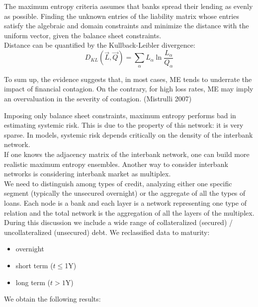 The maximum entropy criteria assumes that banks spread their lending as evenly as possible. Finding the unknown entries of the liability matrix whose entries satisfy the algebraic and domain constraints and minimize the distance with the uniform vector, given the balance sheet constraints.\\
Distance can be quantified by the Kullback-Leibler divergence:
\[
D_{KL} (\vec{L}, \vec{Q}) = \sum_\alpha L_\alpha \ln \frac{L_\alpha}{Q_\alpha}
\]
\begin{myquote}
	To sum up, the evidence suggests that, in most cases, ME tends to underrate the impact of financial contagion. On the contrary, for high loss rates, ME may imply an overvaluation in the severity of
	contagion. (Mistrulli 2007)
\end{myquote}
Imposing only balance sheet constraints, maximum entropy performs bad in estimating systemic risk. This is due to the property of this network: it is very sparse. In models, systemic risk depends critically on the density of the interbank network.\\
If one knows the adjacency matrix of the interbank network, one can build more realistic maximum entropy ensembles.
Another way to consider interbank networks is considering interbank market as multiplex.\\
We need to distinguish among types of credit, analyzing either one specific segment (typically the unsecured overnight) or the aggregate of all the types of loans. Each node is a bank and each layer is a network representing one type of relation and the total network is the aggregation of all the layers of the multiplex.\\
During this discussion we include a wide range of collateralized (secured) / uncollateralized (unsecured) debt. We reclassified data to maturity:
\begin{itemize}
	\item overnight 
	\item short term ($t\leq$1Y)
	\item long term ($t >1$Y)
\end{itemize}
We obtain the following results:
